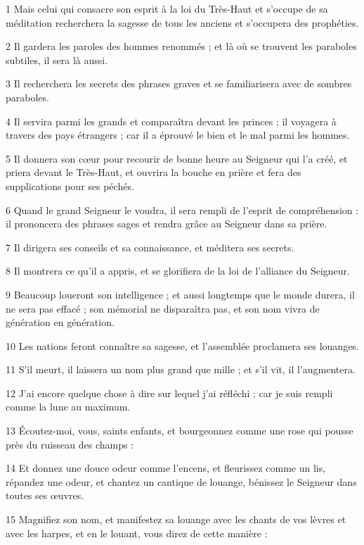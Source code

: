 
\par 1 Mais celui qui consacre son esprit à la loi du Très-Haut et s'occupe de sa méditation recherchera la sagesse de tous les anciens et s'occupera des prophéties.
\par 2 Il gardera les paroles des hommes renommés ; et là où se trouvent les paraboles subtiles, il sera là aussi.
\par 3 Il recherchera les secrets des phrases graves et se familiarisera avec de sombres paraboles.
\par 4 Il servira parmi les grands et comparaîtra devant les princes ; il voyagera à travers des pays étrangers ; car il a éprouvé le bien et le mal parmi les hommes.
\par 5 Il donnera son cœur pour recourir de bonne heure au Seigneur qui l'a créé, et priera devant le Très-Haut, et ouvrira la bouche en prière et fera des supplications pour ses péchés.
\par 6 Quand le grand Seigneur le voudra, il sera rempli de l'esprit de compréhension : il prononcera des phrases sages et rendra grâce au Seigneur dans sa prière.
\par 7 Il dirigera ses conseils et sa connaissance, et méditera ses secrets.
\par 8 Il montrera ce qu'il a appris, et se glorifiera de la loi de l'alliance du Seigneur.
\par 9 Beaucoup loueront son intelligence ; et aussi longtemps que le monde durera, il ne sera pas effacé ; son mémorial ne disparaîtra pas, et son nom vivra de génération en génération.
\par 10 Les nations feront connaître sa sagesse, et l'assemblée proclamera ses louanges.
\par 11 S'il meurt, il laissera un nom plus grand que mille ; et s'il vit, il l'augmentera.
\par 12 J'ai encore quelque chose à dire sur lequel j'ai réfléchi ; car je suis rempli comme la lune au maximum.
\par 13 Écoutez-moi, vous, saints enfants, et bourgeonnez comme une rose qui pousse près du ruisseau des champs :
\par 14 Et donnez une douce odeur comme l'encens, et fleurissez comme un lis, répandez une odeur, et chantez un cantique de louange, bénissez le Seigneur dans toutes ses œuvres.
\par 15 Magnifiez son nom, et manifestez sa louange avec les chants de vos lèvres et avec les harpes, et en le louant, vous direz de cette manière :
